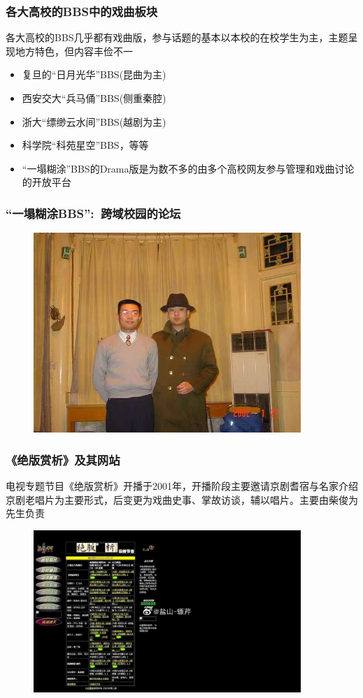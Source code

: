 \documentclass[cjk,slidestop,compress,mathserif,blue]{beamer}
\begin{document}
\frame
{
	\frametitle{各大高校的\rm{BBS}中的戏曲板块}
各大高校的\textrm{BBS}几乎都有戏曲版，参与话题的基本以本校的在校学生为主，主题呈现地方特色，但内容丰俭不一
	\begin{itemize}
   		\setlength{\itemsep}{15pt}
		\item 复旦的“日月光华”\textrm{BBS}(昆曲为主)
		\item 西安交大“兵马俑”\textrm{BBS}(侧重秦腔)
		\item 浙大“缥缈云水间”\textrm{BBS}(越剧为主)
		\item 科学院“科苑星空”\textrm{BBS}，等等
		\item “一塌糊涂”\textrm{BBS}的\textrm{Drama}版是为数不多的由多个高校网友参与管理和戏曲讨论的开放平台
	\end{itemize}
}

\frame
{
	\frametitle{“一塌糊涂\rm{BBS}”:~跨域校园的论坛}
\begin{figure}[h!]
\centering
\vspace{-0.2in}
\includegraphics[height=0.70\textwidth,width=0.90\textwidth,clip]{Figures/PekOpe_Hutu-1.jpg}
\label{THU}
\end{figure}
}

\frame
{
	\frametitle{《绝版赏析》及其网站}
	电视专题节目《绝版赏析》开播于2001年，开播阶段主要邀请京剧耆宿与名家介绍京剧老唱片为主要形式，后变更为戏曲史事、掌故访谈，辅以唱片。主要由柴俊为先生负责
\begin{figure}[h!]
\centering
\vspace{-0.05in}
\includegraphics[height=0.55\textwidth,width=0.90\textwidth,clip]{Figures/PekOpe_Jueban.jpg}
\label{Jueban}
\end{figure}
}
\end{document}
